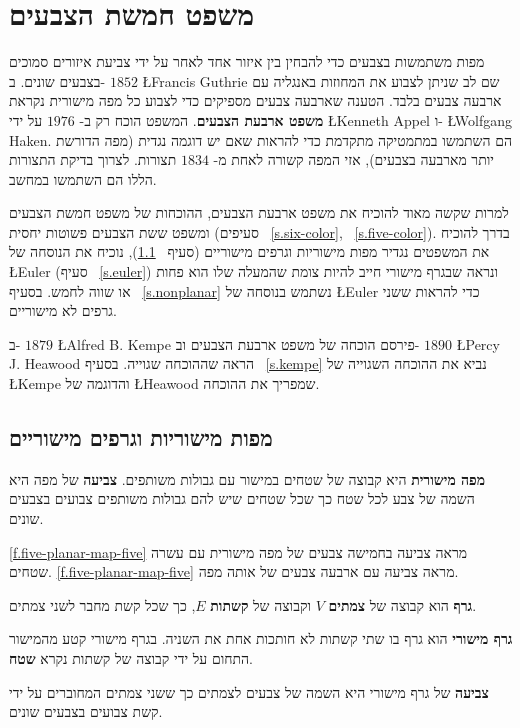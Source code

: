 


\chapter{משפט חמשת הצבעים}
\label{c.five}

מפות משתמשות בצבעים כדי להבחין בין איזור אחד לאחר על ידי צביעת איזורים סמוכים בצבעים שונים. ב-%
$1852$
\L{Francis Guthrie}
שם לב שניתן לצבוע את המחוזות באנגליה עם ארבעה צבעים בלבד. הטענה שארבעה צבעים מספיקים כדי לצבוע כל מפה מישורית נקראת 
\textbf{משפט ארבעת הצבעים}.
המשפט הוכח רק ב-%
$1976$
על ידי
\L{Kenneth Appel}
ו-%
\L{Wolfgang Haken}.
הם השתמשו במתמטיקה מתקדמת כדי להראות שאם יש דוגמה נגדית (מפה הדורשת יותר מארבעה בצבעים), אזי המפה קשורה לאחת מ-%
$1834$
תצורות. לצרוך בדיקת התצורות הללו הם השתמשו במחשב.

למרות שקשה מאוד להוכיח את משפט ארבעת הצבעים, ההוכחות של משפט חמשת הצבעים ומשפט ששת הצבעים פשוטות יחסית (סעיפים%
~\ref{s.six-color}, ~\ref{s.five-color}).
בדרך להוכיח את המשפטים נגדיר מפות מישוריות וגרפים מישוריים (סעיף%
~\ref{s.planar}),
נוכיח את הנוסחה של
\L{Euler}
(סעיף%
~\ref{s.euler})
ונראה שבגרף מישורי חייב להיות צומת שהמעלה שלו הוא פחות או שווה לחמש. בסעיף%
~\ref{s.nonplanar}
נשתמש בנוסחה של
\L{Euler}
כדי להראות ששני גרפים לא מישוריים.

ב-%
$1879$
\L{Alfred B. Kempe}
פירסם הוכחה של משפט ארבעת הצבעים וב-%
$1890$
\L{Percy J. Heawood}
הראה שההוכחה שגוייה. בסעיף%
~\ref{s.kempe}
נביא את ההוכחה השגוייה של 
\L{Kempe}
והדוגמה של
\L{Heawood}
שמפריך את ההוכחה.


\section{מפות מישוריות וגרפים מישוריים}\label{s.planar}

\begin{definition}
\textbf{מפה מישורית}
היא קבוצה של שטחים במישור עם גבולות משותפים.
\textbf{צביעה}
של מפה היא השמה של צבע לכל שטח כך שכל שטחים שיש להם גבולות  משותפים צבועים בצבעים שונים.
\end{definition}
\ref{f.five-planar-map-five}
מראה צביעה בחמישה צבעים של מפה מישורית עם עשרה שטחים.
\ref{f.five-planar-map-five}
מראה צביעה עם ארבעה צבעים של אותה מפה.
\begin{definition}
\textbf{גרף}
הוא קבוצה של 
\textbf{צמתים}
$V$
וקבוצה של 
\textbf{קשתות}
$E$,
כך שכל קשת מחבר לשני צמתים.

\textbf{גרף מישורי}
הוא גרף בו שתי קשתות לא חותכות אחת את השניה. בגרף מישורי קטע מהמישור התחום על ידי קבוצה של קשתות נקרא 
\textbf{שטח}.

\textbf{צביעה}
של גרף מישורי היא השמה של צבעים לצמתים כך ששני צמתים המחוברים על ידי קשת צבועים בצבעים שונים.
\end{definition}



